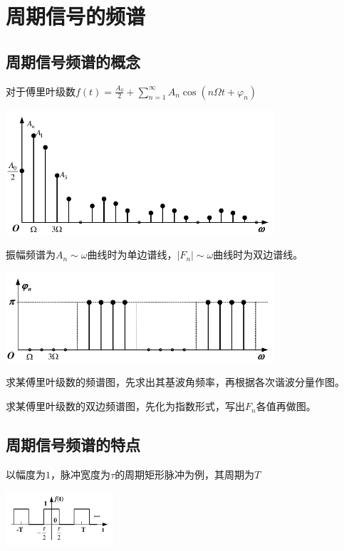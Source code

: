 \section{周期信号的频谱}

\subsection{周期信号频谱的概念}

对于傅里叶级数$f(t) = \frac{A_0}{2}+\sum\limits_{n=1}^{\infty}A_n\cos(n\Omega t+ \varphi_n)$

\begin{Figure}[振幅频谱]
    \includegraphics[width=100mm]{visio/4.3.pdf}
\end{Figure}

振幅频谱为$A_n\sim\omega$曲线时为单边谱线，$|F_n|\sim\omega$曲线时为双边谱线。

\begin{Figure}[相位频谱]
    \includegraphics[width=100mm]{visio/4.4.pdf}
\end{Figure}

求某傅里叶级数的频谱图，先求出其基波角频率，再根据各次谐波分量作图。

求某傅里叶级数的双边频谱图，先化为指数形式，写出$F_n$各值再做图。

\subsection{周期信号频谱的特点}

以幅度为$1$，脉冲宽度为$\tau$的周期矩形脉冲为例，其周期为$T$

\begin{Figure}[周期矩形脉冲]
    \includegraphics[width=40mm]{visio/4.5.pdf}
\end{Figure}

